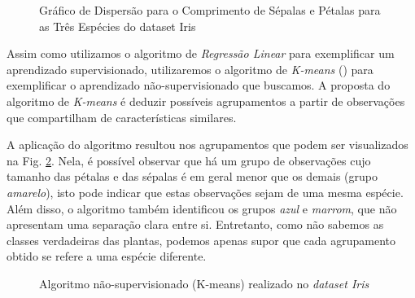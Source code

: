 \begin{figure}[H]
    \caption{Gráfico de Dispersão para o Comprimento de Sépalas e Pétalas para as Três Espécies do dataset Iris}
    \label{fig:iris_unclustered}
\end{figure}

Assim como utilizamos o algoritmo de \textit{Regressão Linear} para exemplificar um aprendizado supervisionado, utilizaremos o algoritmo de \textit{K-means} (\cite{macqueen1967}) para exemplificar o aprendizado não-supervisionado que buscamos. A proposta do algoritmo de \textit{K-means} é deduzir possíveis agrupamentos a partir de observações que compartilham de características similares. 

A aplicação do algoritmo resultou nos agrupamentos que podem ser visualizados na Fig. \ref{fig:iris}. Nela, é possível observar que há um grupo de observações cujo tamanho das pétalas e das sépalas é em geral menor que os demais (grupo \textit{amarelo}), isto pode indicar que estas observações sejam de uma mesma espécie. Além disso, o algoritmo também identificou os grupos \textit{azul} e \textit{marrom}, que não apresentam uma separação clara entre si. Entretanto, como não sabemos as classes verdadeiras das plantas, podemos apenas supor que cada agrupamento obtido se refere a uma espécie diferente. 

\begin{figure}[H]
    \caption{\label{fig:iris} Algoritmo não-supervisionado (K-means) realizado no \textit{dataset Iris} }
  \end{figure}

